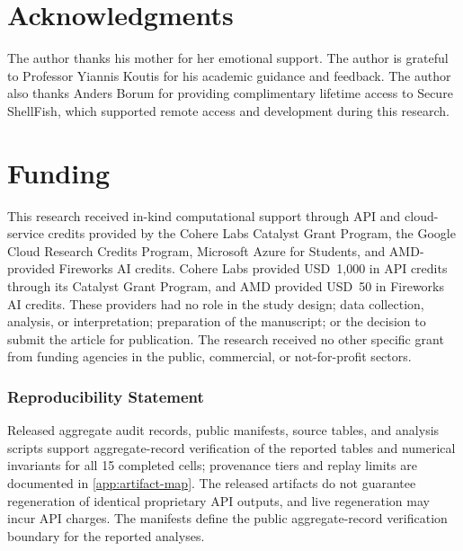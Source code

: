 \documentclass[preprint,12pt]{elsarticle}
\begin{document}
\begin{frontmatter}

\end{frontmatter}















\section*{Acknowledgments}
The author thanks his mother for her emotional support. The author is grateful to Professor Yiannis
Koutis for his academic guidance and feedback. The author also thanks Anders Borum for providing
complimentary lifetime access to Secure ShellFish, which supported remote access and development
during this research.

\section*{Funding}
This research received in-kind computational support through API and cloud-service credits provided
by the Cohere Labs Catalyst Grant Program, the Google Cloud Research Credits Program, Microsoft
Azure for Students, and \mbox{AMD-provided} Fireworks AI credits. Cohere Labs provided USD~1{,}000 in API
credits through its Catalyst Grant Program, and AMD provided USD~50 in Fireworks AI credits. These
providers had no role in the study design; data collection, analysis, or interpretation; preparation
of the manuscript; or the decision to submit the article for publication. The research received no
other specific grant from funding agencies in the public, commercial, or not-for-profit sectors.

\subsubsection*{Reproducibility Statement}
Released aggregate audit records, public manifests, source tables, and analysis scripts support
aggregate-record verification of the reported tables and numerical invariants for all 15 completed
cells; provenance tiers and replay limits are documented in \ref{app:artifact-map}. The released
artifacts do not guarantee regeneration of identical proprietary API outputs, and live regeneration
may incur API charges. The manifests define the public aggregate-record verification boundary for
the reported analyses.
\end{document}

